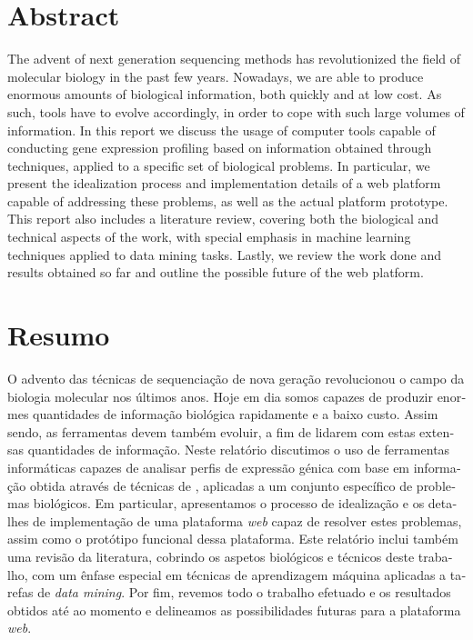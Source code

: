 \chapter*{Abstract}

The advent of next generation sequencing methods has revolutionized the field of
molecular biology in the past few years. Nowadays, we are able to produce
enormous amounts of biological information, both quickly and at low cost. As
such, tools have to evolve accordingly, in order to cope with such large volumes
of information. In this report we discuss the usage of computer tools capable of
conducting gene expression profiling based on information obtained through
\rnaseq{} techniques, applied to a specific set of biological problems. In
particular, we present the idealization process and implementation details of a
web platform capable of addressing these problems, as well as the actual
platform prototype. This report also includes a literature review, covering both
the biological and technical aspects of the work, with special emphasis in
machine learning techniques applied to data mining tasks. Lastly, we review the
work done and results obtained so far and outline the possible future of the web
platform.

\chapter*{Resumo}

\begin{otherlanguage}{portuguese}
O advento das técnicas de sequenciação de nova geração revolucionou o campo da
biologia molecular nos últimos anos. Hoje em dia somos capazes de produzir
enormes quantidades de informação biológica rapidamente e a baixo custo. Assim
sendo, as ferramentas devem também evoluir, a fim de lidarem com estas extensas
quantidades de informação. Neste relatório discutimos o uso de ferramentas
informáticas capazes de analisar perfis de expressão génica com base em
informação obtida através de técnicas de \textit{\rnaseq{}}, aplicadas a um
conjunto específico de problemas biológicos. Em particular, apresentamos o
processo de idealização e os detalhes de implementação de uma plataforma
\textit{web} capaz de resolver estes problemas, assim como o protótipo funcional
dessa plataforma. Este relatório inclui também uma revisão da literatura,
cobrindo os aspetos biológicos e técnicos deste trabalho, com um ênfase especial
em técnicas de aprendizagem máquina aplicadas a tarefas de \textit{data mining}.
Por fim, revemos todo o trabalho efetuado e os resultados obtidos até ao momento
e delineamos as possibilidades futuras para a plataforma \textit{web}.
\end{otherlanguage}

